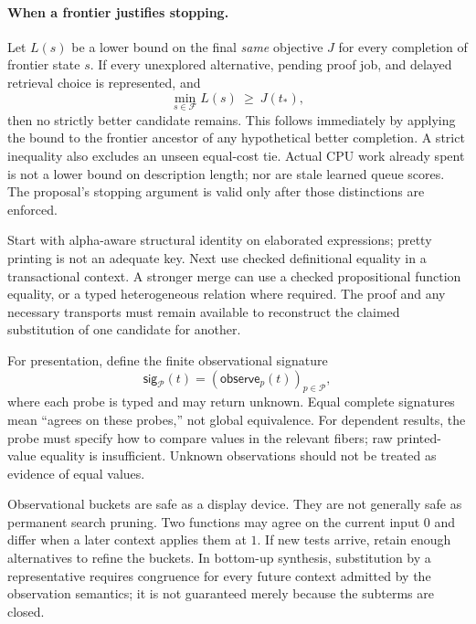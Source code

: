 \paragraph{When a frontier justifies stopping.}
Let $L(s)$ be a lower bound on the final \emph{same} objective $J$ for every
completion of frontier state $s$. If every unexplored alternative, pending
proof job, and delayed retrieval choice is represented, and
\[
 \min_{s\in\mathcal F} L(s)\ \ge\ J(t_*),
\]
then no strictly better candidate remains. This follows immediately by applying
the bound to the frontier ancestor of any hypothetical better completion.
A strict inequality also excludes an unseen equal-cost tie. Actual CPU work
already spent is not a lower bound on description length; nor are stale
learned queue scores. The proposal's stopping argument is valid only after
those distinctions are enforced.


Start with alpha-aware structural identity on elaborated expressions; pretty
printing is not an adequate key. Next use checked definitional equality in a
transactional context. A stronger merge can use a checked propositional
function equality, or a typed heterogeneous relation where required. The
proof and any necessary transports must remain available to reconstruct the
claimed substitution of one candidate for another.

For presentation, define the finite observational signature
\[
 \mathsf{sig}_{\mathcal P}(t)=
   (\mathsf{observe}_{p}(t))_{p\in\mathcal P},
\]
where each probe is typed and may return unknown. Equal complete signatures
mean ``agrees on these probes,'' not global equivalence. For dependent results,
the probe must specify how to compare values in the relevant fibers; raw
printed-value equality is insufficient. Unknown observations should not be
treated as evidence of equal values.

Observational buckets are safe as a display device. They are not generally
safe as permanent search pruning. Two functions may agree on the current input
$0$ and differ when a later context applies them at $1$. If new tests arrive,
retain enough alternatives to refine the buckets. In bottom-up synthesis,
substitution by a representative requires congruence for every future context
admitted by the observation semantics; it is not guaranteed merely because
the subterms are closed.

